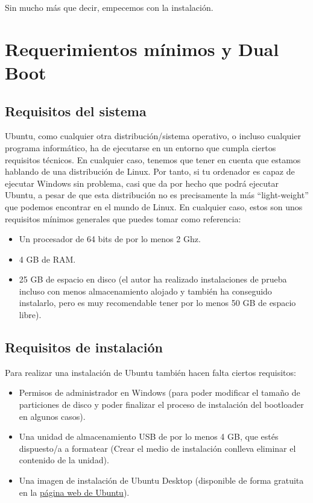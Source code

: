 \documentclass[a4paper,12pt,oneside]{book}
\begin{document}
Sin mucho más que decir, empecemos con la instalación.

\chapter{Requerimientos mínimos y Dual Boot}
\section{Requisitos del sistema}
Ubuntu, como cualquier otra distribución/sistema operativo, o incluso cualquier programa informático, ha de ejecutarse en un entorno que cumpla ciertos requisitos técnicos. En cualquier caso, tenemos que tener en cuenta que estamos hablando de una distribución de Linux. Por tanto, si tu ordenador es capaz de ejecutar Windows sin problema, casi que da por hecho que podrá ejecutar Ubuntu, a pesar de que esta distribución no es precisamente la más “light-weight” que podemos encontrar en el mundo de Linux. En cualquier caso, estos son unos requisitos mínimos generales que puedes tomar como referencia:

\begin{itemize}
    \item Un procesador de 64 bits de por lo menos 2 Ghz.
    \item 4 GB de RAM.
    \item 25 GB de espacio en disco (el autor ha realizado instalaciones de prueba incluso con menos almacenamiento alojado y también ha conseguido instalarlo, pero es muy recomendable tener por lo menos 50 GB de espacio libre).
\end{itemize}

\section{Requisitos de instalación}
Para realizar una instalación de Ubuntu también hacen falta ciertos requisitos:

\begin{itemize}
    \item Permisos de administrador en Windows (para poder modificar el tamaño de particiones de disco y poder finalizar el proceso de instalación del bootloader en algunos casos).
    \item Una unidad de almacenamiento USB de por lo menos 4 GB, que estés dispuesto/a a formatear (Crear el medio de instalación conlleva eliminar el contenido de la unidad).
    \item Una imagen de instalación de Ubuntu Desktop (disponible de forma gratuita en la \href{https://ubuntu.com/download}{página web de Ubuntu}).
\end{itemize}
\end{document}
